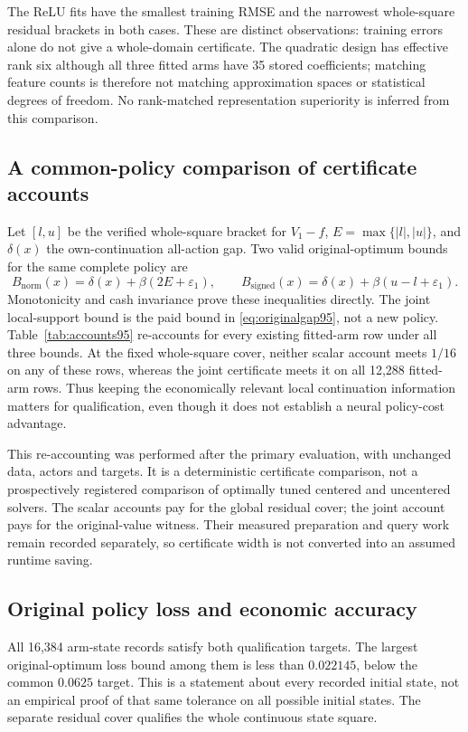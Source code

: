 
The ReLU fits have the smallest training RMSE and the narrowest whole-square residual brackets in both cases. These are distinct observations: training errors alone do not give a whole-domain certificate. The quadratic design has effective rank six although all three fitted arms have 35 stored coefficients; matching feature counts is therefore not matching approximation spaces or statistical degrees of freedom. No rank-matched representation superiority is inferred from this comparison.

\subsection{A common-policy comparison of certificate accounts}
Let $[l,u]$ be the verified whole-square bracket for $V_1-f$, $E=\max\{|l|,|u|\}$, and $\delta(x)$ the own-continuation all-action gap. Two valid original-optimum bounds for the same complete policy are
\[
 B_{\mathrm{norm}}(x)=\delta(x)+\beta(2E+\varepsilon_1),\qquad
 B_{\mathrm{signed}}(x)=\delta(x)+\beta(u-l+\varepsilon_1).
\]
Monotonicity and cash invariance prove these inequalities directly. The joint local-support bound is the paid bound in \eqref{eq:originalgap95}, not a new policy. Table~\ref{tab:accounts95} re-accounts for every existing fitted-arm row under all three bounds. At the fixed whole-square cover, neither scalar account meets $1/16$ on any of these rows, whereas the joint certificate meets it on all 12,288 fitted-arm rows. Thus keeping the economically relevant local continuation information matters for qualification, even though it does not establish a neural policy-cost advantage.


This re-accounting was performed after the primary evaluation, with unchanged data, actors and targets. It is a deterministic certificate comparison, not a prospectively registered comparison of optimally tuned centered and uncentered solvers. The scalar accounts pay for the global residual cover; the joint account pays for the original-value witness. Their measured preparation and query work remain recorded separately, so certificate width is not converted into an assumed runtime saving.

\subsection{Original policy loss and economic accuracy}
All 16,384 arm-state records satisfy both qualification targets. The largest original-optimum loss bound among them is less than $0.022145$, below the common $0.0625$ target. This is a statement about every recorded initial state, not an empirical proof of that same tolerance on all possible initial states. The separate residual cover qualifies the whole continuous state square.

